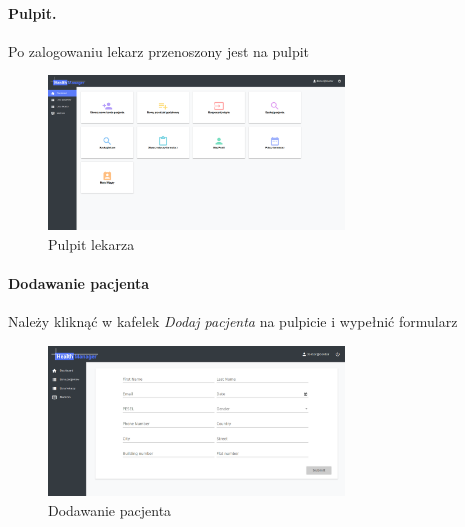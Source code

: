 \documentclass[polish,12pt]{aghthesis}
\begin{document}
    \paragraph{Pulpit.}{Po zalogowaniu lekarz przenoszony jest na pulpit
      \begin{figure}[H]
          \includegraphics[width=0.7\textwidth]{gui-doc-dashboard}
          \caption{Pulpit lekarza}
      \end{figure} 
    }
    \paragraph{Dodawanie pacjenta}{
        Należy kliknąć w kafelek \emph{Dodaj pacjenta} na pulpicie i wypełnić formularz
        \begin{figure}[H]
          \includegraphics[width=0.7\textwidth]{gui-add-patient}
          \caption{Dodawanie pacjenta}
        \end{figure}     
    }
\end{document}
